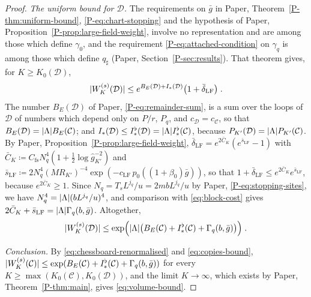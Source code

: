 \documentclass[11pt]{preprint}
\DeclarePairedDelimiter{\abs}{\lvert}{\rvert}
\numberwithin{equation}{section}
\theoremstyle{definition}
\theoremstyle{remark}
\theoremstyle{plain}
\begin{document}
\begin{proof}
\emph{The uniform bound for $\mathcal D$.} The requirements on $\bar g$ in Paper, Theorem~\ref{P-thm:uniform-bound}, \eqref{P-eq:chart-stopping} and the hypothesis of Paper, Proposition~\ref{P-prop:large-field-weight}, involve no representation and are among those which define $\gamma_0$, and the requirement \eqref{P-eq:attached-condition} on $\gamma_q$ is among those which define $q_\sharp$ (Paper, Section~\ref{P-sec:results}). That theorem gives, for $K \geq K_0(\mathcal D)$,
\begin{equation}\label{eq:uniform-bound-copies}
    \abs{W^{(s)}_K(\mathcal D)} \leq e^{B_E(\mathcal D) + I_*(\mathcal D)}\bigl(1 + \bar\delta_{\mathrm{LF}}\bigr)\;.
\end{equation}
The number $B_E(\mathcal D)$ of Paper, \eqref{P-eq:remainder-sum}, is a sum over the loops of $\mathcal D$ of numbers which depend only on $P/r$, $P_q$, and $c_{\mathcal D} = c_{\mathcal C}$, so that $B_E(\mathcal D) = \abs{\Lambda}B_E(\mathcal C)$; and $I_*(\mathcal D) \leq I^\flat_*(\mathcal D) = \abs{\Lambda}I^\flat_*(\mathcal C)$, because $P_{K'}(\mathcal D) = \abs{\Lambda}P_{K'}(\mathcal C)$. By Paper, Proposition~\ref{P-prop:large-field-weight}, $\bar\delta_{\mathrm{LF}} = e^{2\bar C_K}(e^{\bar s_{\mathrm{LF}}} - 1)$ with $\bar C_K \coloneqq C_{\mathrm{fs}}N_q^4(1 + \frac12\log\hat g_{K'}^{-2})$ and $\bar s_{\mathrm{LF}} \coloneqq 2N_q^4(MR_{K'})^{-4}\exp(-c_{\mathrm{LF}}\,p_0((1 + \beta_0)\bar g))$, so that $1 + \bar\delta_{\mathrm{LF}} \leq e^{2\bar C_K}e^{\bar s_{\mathrm{LF}}}$, because $e^{2\bar C_K} \geq 1$. Since $N_q = T_sL^{j_q}/u = 2mbL^{j_q}/u$ by Paper, \eqref{P-eq:stopping-sites}, we have $N_q^4 = \abs{\Lambda}(bL^{j_q}/u)^4$, and comparison with \eqref{eq:block-cost} gives $2\bar C_K + \bar s_{\mathrm{LF}} = \abs{\Lambda}\Gamma_q(b, \bar g)$. Altogether,
\begin{equation}\label{eq:copies-bound}
    \abs{W^{(s)}_K(\mathcal D)} \leq \exp\Bigl(\abs{\Lambda}\bigl(B_E(\mathcal C) + I^\flat_*(\mathcal C) + \Gamma_q(b, \bar g)\bigr)\Bigr)\;.
\end{equation}

\emph{Conclusion.} By \eqref{eq:chessboard-renormalised} and \eqref{eq:copies-bound}, $\abs{W^{(s)}_K(\mathcal C)} \leq \exp(B_E(\mathcal C) + I^\flat_*(\mathcal C) + \Gamma_q(b, \bar g))$ for every $K \geq \max(K_0(\mathcal C), K_0(\mathcal D))$, and the limit $K \to \infty$, which exists by Paper, Theorem~\ref{P-thm:main}, gives \eqref{eq:volume-bound}.
\end{proof}
\end{document}
